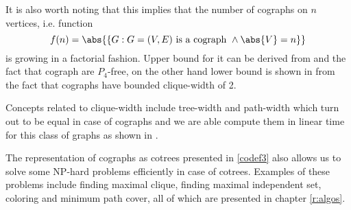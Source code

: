 It is also worth noting that this implies that the number of cographs on $n$ vertices, i.e. function
\[
    f(n) = \abs{\{G : G = (V,E) \text{ is a cograph } \land \abs{V} = n\}}
\]
is growing in a factorial fashion. Upper bound for it can be derived from \cite{lozin} and the fact that cograph are $P_4$-free, on the other hand lower bound is shown in \cite{allen} from the fact that cographs have bounded clique-width of 2.

Concepts related to clique-width include tree-width and path-width which turn out to be equal in case of cographs and we are able compute them in linear time for this class of graphs as shown in \cite{bodlaender}.

The representation of cographs as cotrees presented in \ref{codef3} also allows us to solve some NP-hard problems efficiently in case of cotrees. Examples of these problems include finding maximal clique, finding maximal independent set, coloring and minimum path cover, all of which are presented in chapter \ref{r:algos}.